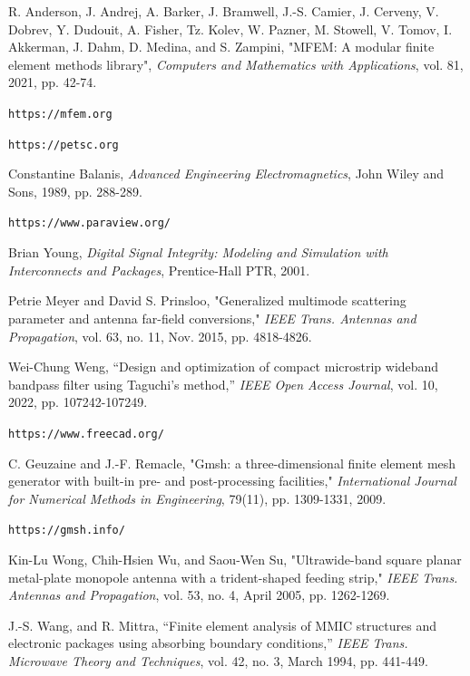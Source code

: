 \documentclass[titlepage]{article}
\renewcommand\_{\textunderscore\linebreak[1]}
\begin{document}
\begin{thebibliography}{unsrt}

 R. Anderson, J. Andrej, A. Barker, J. Bramwell, J.-S. Camier, J. Cerveny, V. Dobrev, Y. Dudouit, A. Fisher, Tz. Kolev, W. Pazner, M. Stowell, V. Tomov, I. Akkerman, J. Dahm, D. Medina, and S. Zampini, "MFEM: A modular finite element methods library", \textit{Computers and Mathematics with Applications}, vol. 81, 2021, pp. 42-74.

 \verb+https://mfem.org+

 \verb+https://petsc.org+

 Constantine Balanis, \textit{Advanced Engineering Electromagnetics}, John Wiley and Sons, 1989, pp. 288-289.

 \verb+https://www.paraview.org/+

 Brian Young, \textit{Digital Signal Integrity: Modeling and Simulation with Interconnects and Packages}, Prentice-Hall PTR, 2001.

 Petrie Meyer and David S. Prinsloo, "Generalized multimode scattering parameter and antenna far-field conversions," \textit{IEEE Trans. Antennas and Propagation}, vol. 63, no. 11, Nov. 2015, pp. 4818-4826.

 Wei-Chung Weng, “Design and optimization of compact microstrip wideband bandpass filter using Taguchi’s method,” \textit{IEEE Open Access Journal}, vol. 10, 2022, pp. 107242-107249.

 \verb+https://www.freecad.org/+

 C. Geuzaine and J.-F. Remacle, "Gmsh: a three-dimensional finite element mesh generator with built-in pre- and post-processing facilities," \textit{International Journal for Numerical Methods in Engineering}, 79(11), pp. 1309-1331, 2009.

 \verb+https://gmsh.info/+

 Kin-Lu Wong, Chih-Hsien Wu, and Saou-Wen Su, "Ultrawide-band square planar metal-plate monopole antenna with a trident-shaped feeding strip," \textit{IEEE Trans. Antennas and Propagation}, vol. 53, no. 4, April 2005, pp. 1262-1269.

 J.-S. Wang, and R. Mittra, “Finite element analysis of MMIC structures and electronic packages using absorbing boundary conditions,” \textit{IEEE Trans. Microwave Theory and Techniques}, vol. 42, no. 3, March 1994, pp. 441-449.


\end{thebibliography}
\end{document}
